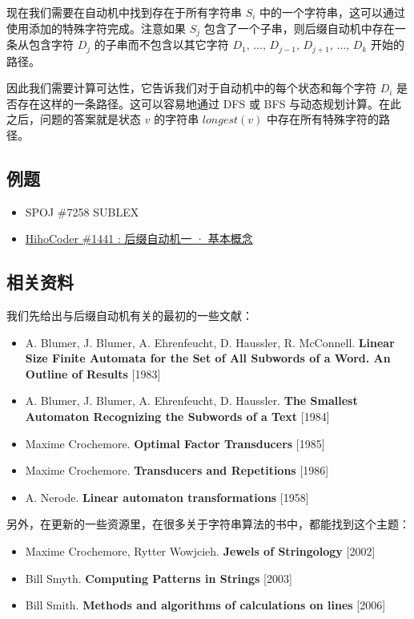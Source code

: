 现在我们需要在自动机中找到存在于所有字符串 \(S_i\)
中的一个字符串，这可以通过使用添加的特殊字符完成。注意如果 \(S_j\)
包含了一个子串，则后缀自动机中存在一条从包含字符 \(D_j\)
的子串而不包含以其它字符
\(D_1,\,\ldots,\,D_{j-1},\,D_{j+1},\,\ldots,\,D_k\) 开始的路径。

因此我们需要计算可达性，它告诉我们对于自动机中的每个状态和每个字符
\(D_i\) 是否存在这样的一条路径。这可以容易地通过 DFS 或 BFS
与动态规划计算。在此之后，问题的答案就是状态 \(v\) 的字符串
\(longest(v)\) 中存在所有特殊字符的路径。

\subsection{例题}

\begin{itemize}
\item
  SPOJ \#7258 SUBLEX
\item
  \href{http://hihocoder.com/problemset/problem/1441}{HihoCoder \#1441 :
  后缀自动机一 · 基本概念}
\end{itemize}

\subsection{相关资料}

我们先给出与后缀自动机有关的最初的一些文献：

\begin{itemize}
\item
  A. Blumer, J. Blumer, A. Ehrenfeucht, D. Haussler, R. McConnell.
  \textbf{Linear Size Finite Automata for the Set of All Subwords of a
  Word. An Outline of Results} {[}1983{]}
\item
  A. Blumer, J. Blumer, A. Ehrenfeucht, D. Haussler. \textbf{The
  Smallest Automaton Recognizing the Subwords of a Text} {[}1984{]}
\item
  Maxime Crochemore. \textbf{Optimal Factor Transducers} {[}1985{]}
\item
  Maxime Crochemore. \textbf{Transducers and Repetitions} {[}1986{]}
\item
  A. Nerode. \textbf{Linear automaton transformations} {[}1958{]}
\end{itemize}

另外，在更新的一些资源里，在很多关于字符串算法的书中，都能找到这个主题：

\begin{itemize}
\item
  Maxime Crochemore, Rytter Wowjcieh. \textbf{Jewels of Stringology}
  {[}2002{]}
\item
  Bill Smyth. \textbf{Computing Patterns in Strings} {[}2003{]}
\item
  Bill Smith. \textbf{Methods and algorithms of calculations on lines}
  {[}2006{]}
\end{itemize}

